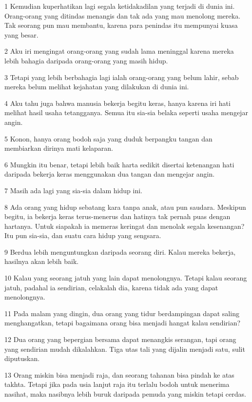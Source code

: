 \par 1 Kemudian kuperhatikan lagi segala ketidakadilan yang terjadi di dunia ini. Orang-orang yang ditindas menangis dan tak ada yang mau menolong mereka. Tak seorang pun mau membantu, karena para penindas itu mempunyai kuasa yang besar.
\par 2 Aku iri mengingat orang-orang yang sudah lama meninggal karena mereka lebih bahagia daripada orang-orang yang masih hidup.
\par 3 Tetapi yang lebih berbahagia lagi ialah orang-orang yang belum lahir, sebab mereka belum melihat kejahatan yang dilakukan di dunia ini.
\par 4 Aku tahu juga bahwa manusia bekerja begitu keras, hanya karena iri hati melihat hasil usaha tetangganya. Semua itu sia-sia belaka seperti usaha mengejar angin.
\par 5 Konon, hanya orang bodoh saja yang duduk berpangku tangan dan membiarkan dirinya mati kelaparan.
\par 6 Mungkin itu benar, tetapi lebih baik harta sedikit disertai ketenangan hati daripada bekerja keras menggunakan dua tangan dan mengejar angin.
\par 7 Masih ada lagi yang sia-sia dalam hidup ini.
\par 8 Ada orang yang hidup sebatang kara tanpa anak, atau pun saudara. Meskipun begitu, ia bekerja keras terus-menerus dan hatinya tak pernah puas dengan hartanya. Untuk siapakah ia memeras keringat dan menolak segala kesenangan? Itu pun sia-sia, dan suatu cara hidup yang sengsara.
\par 9 Berdua lebih menguntungkan daripada seorang diri. Kalau mereka bekerja, hasilnya akan lebih baik.
\par 10 Kalau yang seorang jatuh yang lain dapat menolongnya. Tetapi kalau seorang jatuh, padahal ia sendirian, celakalah dia, karena tidak ada yang dapat menolongnya.
\par 11 Pada malam yang dingin, dua orang yang tidur berdampingan dapat saling menghangatkan, tetapi bagaimana orang bisa menjadi hangat kalau sendirian?
\par 12 Dua orang yang bepergian bersama dapat menangkis serangan, tapi orang yang sendirian mudah dikalahkan. Tiga utas tali yang dijalin menjadi satu, sulit diputuskan.
\par 13 Orang miskin bisa menjadi raja, dan seorang tahanan bisa pindah ke atas takhta. Tetapi jika pada usia lanjut raja itu terlalu bodoh untuk menerima nasihat, maka nasibnya lebih buruk daripada pemuda yang miskin tetapi cerdas.
